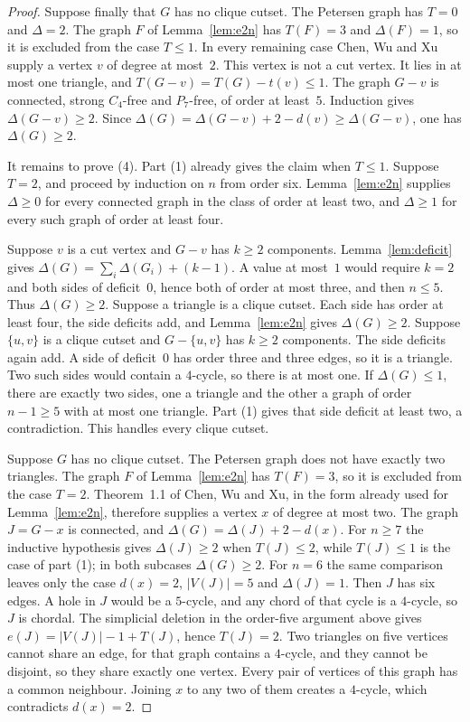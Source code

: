 \documentclass[ASNA]{USG}
\theoremstyle{WBstyletwo}
\numberwithin{equation}{section}
\begin{document}
\begin{proof}
Suppose finally that $G$ has no clique cutset. The Petersen graph has $T=0$ and $\Delta=2$. The graph $F$ of Lemma~\ref{lem:e2n} has $T(F)=3$ and $\Delta(F)=1$, so it is excluded from the case $T\le 1$. In every remaining case Chen, Wu and Xu supply a vertex $v$ of degree at most~$2$. This vertex is not a cut vertex. It lies in at most one triangle, and $T(G-v)=T(G)-t(v)\le 1$. The graph $G-v$ is connected, strong $C_4$-free and $P_7$-free, of order at least~$5$. Induction gives $\Delta(G-v)\ge 2$. Since $\Delta(G)=\Delta(G-v)+2-d(v)\ge\Delta(G-v)$, one has $\Delta(G)\ge 2$.

It remains to prove (4). Part (1) already gives the claim when $T\le 1$. Suppose $T=2$, and proceed by induction on $n$ from order six. Lemma~\ref{lem:e2n} supplies $\Delta\ge 0$ for every connected graph in the class of order at least two, and $\Delta\ge 1$ for every such graph of order at least four.

Suppose $v$ is a cut vertex and $G-v$ has $k\ge 2$ components. Lemma~\ref{lem:deficit} gives $\Delta(G)=\sum_i\Delta(G_i)+(k-1)$. A value at most~$1$ would require $k=2$ and both sides of deficit~$0$, hence both of order at most three, and then $n\le 5$. Thus $\Delta(G)\ge 2$. Suppose a triangle is a clique cutset. Each side has order at least four, the side deficits add, and Lemma~\ref{lem:e2n} gives $\Delta(G)\ge 2$. Suppose $\{u,v\}$ is a clique cutset and $G-\{u,v\}$ has $k\ge 2$ components. The side deficits again add. A side of deficit~$0$ has order three and three edges, so it is a triangle. Two such sides would contain a $4$-cycle, so there is at most one. If $\Delta(G)\le 1$, there are exactly two sides, one a triangle and the other a graph of order $n-1\ge 5$ with at most one triangle. Part (1) gives that side deficit at least two, a contradiction. This handles every clique cutset.

Suppose $G$ has no clique cutset. The Petersen graph does not have exactly two triangles. The graph $F$ of Lemma~\ref{lem:e2n} has $T(F)=3$, so it is excluded from the case $T=2$. Theorem~1.1 of Chen, Wu and Xu, in the form already used for Lemma~\ref{lem:e2n}, therefore supplies a vertex $x$ of degree at most two. The graph $J=G-x$ is connected, and $\Delta(G)=\Delta(J)+2-d(x)$. For $n\ge 7$ the inductive hypothesis gives $\Delta(J)\ge 2$ when $T(J)\le 2$, while $T(J)\le 1$ is the case of part (1); in both subcases $\Delta(G)\ge 2$. For $n=6$ the same comparison leaves only the case $d(x)=2$, $|V(J)|=5$ and $\Delta(J)=1$. Then $J$ has six edges. A hole in $J$ would be a $5$-cycle, and any chord of that cycle is a $4$-cycle, so $J$ is chordal. The simplicial deletion in the order-five argument above gives $e(J)=|V(J)|-1+T(J)$, hence $T(J)=2$. Two triangles on five vertices cannot share an edge, for that graph contains a $4$-cycle, and they cannot be disjoint, so they share exactly one vertex. Every pair of vertices of this graph has a common neighbour. Joining $x$ to any two of them creates a $4$-cycle, which contradicts $d(x)=2$.
\end{proof}
\end{document}
